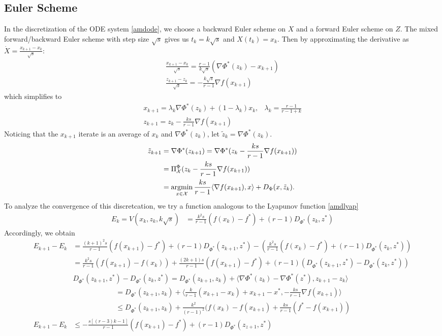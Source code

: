 \subsection{Euler Scheme}
In the discretization of the ODE system \eqref{amdode}, we choose a backward Euler scheme on $X$ and a forward Euler scheme on $Z$. 
The mixed forward/backward Euler scheme with step size $\sqrt{s}$ gives us $t_k = k\sqrt{s}$ and $X(t_k) = x_k$. Then by approximating the derivative as $\dot X = \frac{x_{k+1}-x_k}{\sqrt{s}}$:
\begin{align*}
\frac{x_{k+1} - x_k}{\sqrt{s}} = \frac{r-1}{k\sqrt{s}} (\nabla \Phi^*(z_k) - x_{k+1})\\
\frac{z_{k+1} - z_k}{\sqrt{s}} = -\frac{k\sqrt{s}}{r-1} \nabla f(x_{k+1})
\end{align*}
which simplifies to
\begin{align*}
x_{k+1}  = \lambda_k \nabla \Phi^*(z_k) + (1-\lambda_k) x_{k} ,& \lambda_k = \frac{r-1}{r-1+k}\\
z_{k+1} = z_k -\frac{ks}{r-1} \nabla f(x_{k+1}) 
\end{align*}
Noticing that the $x_{k+1}$ iterate is an average of $x_k$ and $\nabla \Phi^*(z_k)$, let $\tilde z_k =\nabla\Phi^*(z_k)$.
\begin{align*}
\tilde z_{k+1} &= \nabla\Phi^*(z_{k+1}) = \nabla\Phi^*(z_k -\frac{ks}{r-1} \nabla f(x_{k+1}))\\
&= \Pi_{\mathcal{X}}^{\Phi} (z_k -\frac{ks}{r-1} \nabla f(x_{k+1}))\\
&= \argmin_{x\in\mathcal{X}} \frac{ks}{r-1} \langle \nabla f(x_{k+1}), x \rangle + D_\Phi (x, \tilde z_k).
\end{align*}
To analyze the convergence of this discretcation, we try a function analogous to the Lyapunov function \eqref{amdlyap}
\begin{align*}
E_k = V(x_k, z_k, k\sqrt{s}) &= \frac{k^2s}{r-1} (f(x_k) - f^*) + (r-1)D_{\Phi^*}(z_k,z^*)
\end{align*}
Accordingly, we obtain
\begin{align*}
E_{k+1} - E_k &= \frac{(k+1)^2s}{r-1} (f(x_{k+1}) - f^*) + (r-1)D_{\Phi^*}(z_{k+1},z^*) - \left(\frac{k^2s}{r-1} (f(x_k) - f^*) + (r-1)D_{\Phi^*}(z_k,z^*)\right)\\
&= \frac{k^2s}{r-1} (f(x_{k+1}) - f(x_k)) + \frac{(2k +1)s}{r-1} (f(x_{k+1}) - f^*) + (r-1)(D_{\Phi^*}(z_{k+1},z^*) - D_{\Phi^*}(z_k,z^*))\\
& D_{\Phi^*}(z_{k+1},z^*) - D_{\Phi^*}(z_k,z^*) =  D_{\Phi^*}(z_{k+1},z_k) + \langle \nabla \Phi^*(z_k) -\nabla\Phi^*(z^*), z_{k+1} - z_k \rangle\\
&\qquad\qquad\qquad =D_{\Phi^*}(z_{k+1},z_k) + \langle  \frac{k}{r-1}(x_{k+1} - x_k) + x_{k+1} - x^*, -\frac{ks}{r-1} \nabla f(x_{k+1}) \rangle\\
&\qquad\qquad\qquad \leq D_{\Phi^*}(z_{k+1},z_k) + \frac{k^2}{(r-1)^2}(f(x_k) - f(x_{k+1}) + \frac{ks}{r-1}(f^* - f(x_{k+1}))\\
E_{k+1} - E_k &\leq -\frac{s[(r-3)k-1]}{r-1} (f(x_{k+1}) - f^*) + (r-1)D_{\Phi^*}(z_{z+1},z^*)
\end{align*}

